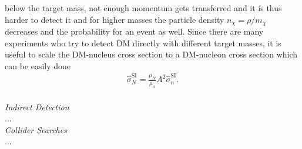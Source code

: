 below the target mass, not enough momentum gets transferred and it is thus harder to detect it and for higher masses the particle density $n_\chi=\rho/m_\chi$
decreases and the probability for an event as well. Since there are many experiments who try to detect DM directly with different target masses,
it is useful to scale the DM-nucleus cross section to a DM-nucleon cross section which can be easily done
\begin{align}
 \hat\sigma_N^\text{SI} = \frac{\mu_N}{\mu_n} A^2 \hat\sigma_n^\text{SI}.
\end{align}
\\ \textit{Indirect Detection} \\
\noindent ...
\\ \textit{Collider Searches}\\
\noindent ...